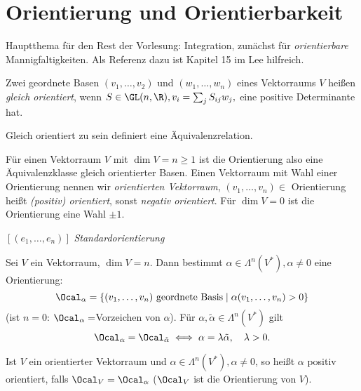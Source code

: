\chapter{Orientierung und Orientierbarkeit}

\lecture
Hauptthema für den Rest der Vorlesung: Integration, zunächst für \emph{orientierbare} Mannigfaltigkeiten. Als Referenz dazu ist Kapitel 15 im Lee hilfreich.


\begin{defn}[Orientierung]	
	Zwei geordnete Basen \( (v_1, \dotsc, v_2) \) und \( (w_1, \dotsc, w_n) \) eines Vektorraums $V$ heißen \emph{gleich orientiert}, wenn \( S \in \GL(n,\R), v_i = \sum_j S_{ij} w_j, \) eine positive Determinante hat.
\end{defn}

\begin{rem*}
	Gleich orientiert zu sein definiert eine Äquivalenzrelation.
\end{rem*}

Für einen Vektorraum $V$ mit $\dim V = n \geq 1$ ist die Orientierung also eine Äquivalenzklasse gleich orientierter Basen. Einen Vektorraum mit Wahl einer Orientierung nennen wir \emph{orientierten Vektorraum}, \( (v_1, \dotsc, v_n) \in \) Orientierung heißt \emph{(positiv) orientiert}, sonst \emph{negativ orientiert}. Für \( \dim V = 0 \) ist die Orientierung eine Wahl $\pm1$.

\begin{exmp*}
	\( [(e_1, \dotsc, e_n)] \) \emph{Standardorientierung}
\end{exmp*}

\begin{lem}
	Sei $V$ ein Vektorraum, $\dim V = n$. Dann bestimmt \( \alpha \in \Lambda^n(V^*), \alpha \neq 0 \) eine Orientierung:
	\[ \Ocal_\alpha = \{ (v_1,\dotsc, v_n) \ \text{geordnete Basis} \mid \alpha(v_1, \dotsc, v_n) > 0 \} \]
	(ist $n = 0$: $\Ocal_\alpha = $Vorzeichen von $\alpha$). Für \( \alpha, \tilde{\alpha} \in \Lambda^n(V^*) \) gilt
	\[ \Ocal_\alpha = \Ocal_{\tilde{\alpha}} \iff \alpha = \lambda \tilde{\alpha},\quad \lambda > 0. \]
\end{lem}

\begin{rem*}
	Ist $V$ ein orientierter Vektorraum und \( \alpha \in \Lambda^n(V^*), \alpha \neq 0 \), so heißt $\alpha$ positiv orientiert, falls \( \Ocal_V = \Ocal_\alpha \) ($\Ocal_V$ ist die Orientierung von $V$).
\end{rem*}

